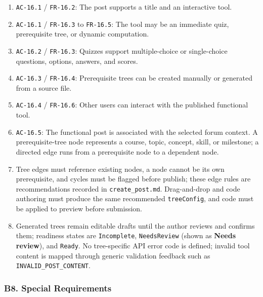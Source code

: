 \documentclass[12pt]{article}
\begin{document}
\begin{enumerate}
\item \texttt{AC-16.1} / \texttt{FR-16.2}: The post supports a title and an interactive tool.
\item \texttt{AC-16.1} / \texttt{FR-16.3} to \texttt{FR-16.5}: The tool may be an immediate quiz, prerequisite tree, or dynamic computation.
\item \texttt{AC-16.2} / \texttt{FR-16.3}: Quizzes support multiple-choice or single-choice questions, options, answers, and scores.
\item \texttt{AC-16.3} / \texttt{FR-16.4}: Prerequisite trees can be created manually or generated from a source file.
\item \texttt{AC-16.4} / \texttt{FR-16.6}: Other users can interact with the published functional tool.
\item \texttt{AC-16.5}: The functional post is associated with the selected forum context. A prerequisite-tree node represents a course, topic, concept, skill, or milestone; a directed edge runs from a prerequisite node to a dependent node.
\item Tree edges must reference existing nodes, a node cannot be its own prerequisite, and cycles must be flagged before publish; these edge rules are recommendations recorded in \texttt{create\_post.md}. Drag-and-drop and code authoring must produce the same recommended \texttt{treeConfig}, and code must be applied to preview before submission.
\item Generated trees remain editable drafts until the author reviews and confirms them; readiness states are \texttt{Incomplete}, \texttt{NeedsReview} (shown as \textbf{Needs review}), and \texttt{Ready}. No tree-specific API error code is defined; invalid tool content is mapped through generic validation feedback such as \texttt{INVALID\_POST\_CONTENT}.
\end{enumerate}
\par\medskip

\hypertarget{sec:b8-special-requirements}{}
\subsubsection*{B8. Special Requirements}
\par\medskip
\end{document}
